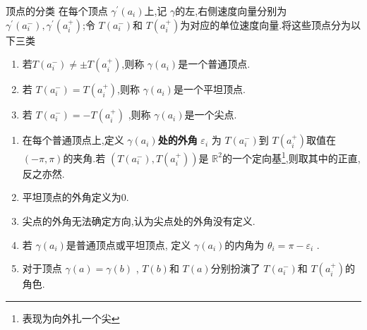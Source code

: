 \documentclass[../../几何与拓扑.tex]{subfiles}
\begin{document}
\begin{definition}{顶点的分类}
    在每个顶点 \(   \gamma ^{\prime} \left( a_{i} \right)   \)上,记 \(   \gamma   \)的左,右侧速度向量分别为 \(   \gamma ^{\prime} \left( a_{i}^{-} \right), \gamma ^{\prime} \left( a_{i}^{+ } \right)    \);令 \(  T\left( a_{i}^{-} \right)   \)和 \(  T\left( a_{i}^{+ } \right)   \)为对应的单位速度向量.将这些顶点分为以下三类
    \begin{enumerate}
        \item 若\(  T\left( a_{i}^{-} \right)\neq \pm T\left( a_{i}^{+ } \right)    \),则称 \(   \gamma \left( a_{i} \right)   \)是一个普通顶点.
        \item 若 \(  T\left( a_{i}^{-} \right)= T\left( a_{i}^{+ } \right)    \),则称 \(   \gamma \left( a_{i} \right)   \)是一个平坦顶点.    
        \item 若 \(  T\left( a_{i}^{-} \right)= -T\left( a_{i} ^{+ }\right)    \) ,则称 \(   \gamma \left( a_{i} \right)   \)是一个尖点. 
    \end{enumerate}
         
\end{definition}

\begin{definition}
   \begin{enumerate}
    \item  在每个普通顶点上,定义 \textbf{\(   \gamma \left( a_{i} \right)   \)处的外角 } \(   \varepsilon _{i}  \) 为 \(  T\left( a_{i}^{-} \right)   \)到 \(  T\left( a_{i}^{+ } \right)   \)取值在 \(  \left( -\pi  ,\pi \right)   \)的夹角.若 \(  \left( T\left( a_{i}^{-} \right),T\left( a_{i}^{+ } \right)   \right)   \)是 \(  \mathbb{R} ^{2}  \)的一个定向基\footnote{表现为向外扎一个尖},则取其中的正直,反之亦然.
    \item 平坦顶点的外角定义为0.
    \item 尖点的外角无法确定方向,认为尖点处的外角没有定义.
    \item 若 \(   \gamma \left( a_{i} \right)   \)是普通顶点或平坦顶点, 定义 \(   \gamma \left( a_{i} \right)   \)的内角为 \(   \theta _{i}= \pi - \varepsilon _{i}  \) .
    \item 对于顶点 \(   \gamma \left( a \right)=  \gamma \left( b \right)    \) , \(  T\left( b \right)   \)和 \(  T\left( a \right)   \)分别扮演了 \(  T\left( a_{i}^{-} \right)   \)和 \(  T\left( a_{i}^{+ } \right)   \)的角色.    
   \end{enumerate}
   
\end{definition}
\end{document}
